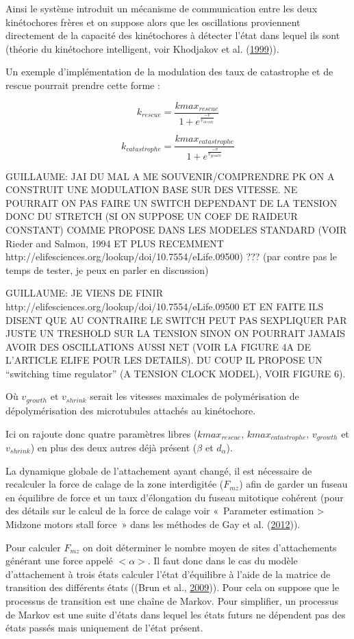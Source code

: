 \documentclass[12pt,a4paper,twoside,openright]{book}
\begin{document}
Ainsi le système introduit un mécanisme de communication entre les deux
kinétochores frères et on suppose alors que les oscillations proviennent
directement de la capacité des kinétochores à détecter l'état dans
lequel ils sont (théorie du kinétochore intelligent, voir Khodjakov et
al. (\protect\hyperlink{ref-Khodjakov1999}{1999})).

Un exemple d'implémentation de la modulation des taux de catastrophe et
de rescue pourrait prendre cette forme :

\[
k_{rescue} = \frac{kmax_{rescue}}{1 + e^{\frac{-v}{v_{shrink}}}}
\]

\[
k_{catastrophe} = \frac{kmax_{catastrophe}}{1 + e^{\frac{-v}{v_{growth}}}}
\]

GUILLAUME: JAI DU MAL A ME SOUVENIR/COMPRENDRE PK ON A CONSTRUIT UNE
MODULATION BASE SUR DES VITESSE. NE POURRAIT ON PAS FAIRE UN SWITCH
DEPENDANT DE LA TENSION DONC DU STRETCH (SI ON SUPPOSE UN COEF DE
RAIDEUR CONSTANT) COMME PROPOSE DANS LES MODELES STANDARD (VOIR Rieder
and Salmon, 1994 ET PLUS RECEMMENT
http://elifesciences.org/lookup/doi/10.7554/eLife.09500) ??? (par contre
pas le temps de tester, je peux en parler en discussion)

GUILLAUME: JE VIENS DE FINIR
http://elifesciences.org/lookup/doi/10.7554/eLife.09500 ET EN FAITE ILS
DISENT QUE AU CONTRAIRE LE SWITCH PEUT PAS SEXPLIQUER PAR JUSTE UN
TRESHOLD SUR LA TENSION SINON ON POURRAIT JAMAIS AVOIR DES OSCILLATIONS
AUSSI NET (VOIR LA FIGURE 4A DE L'ARTICLE ELIFE POUR LES DETAILS). DU
COUP IL PROPOSE UN ``switching time regulator'' (A TENSION CLOCK MODEL),
VOIR FIGURE 6).

Où \(v_{growth}\) et \(v_{shrink}\) serait les vitesses maximales de
polymérisation de dépolymérisation des microtubules attachés au
kinétochore.

Ici on rajoute donc quatre paramètres libres (\(kmax_{rescue}\),
\(kmax_{catastrophe}\), \(v_{growth}\) et \(v_{shrink}\)) en plus des
deux autres déjà présent (\(\beta\) et \(d_{\alpha}\)).

La dynamique globale de l'attachement ayant changé, il est nécessaire de
recalculer la force de calage de la zone interdigitée (\(F_{mz}\)) afin
de garder un fuseau en équilibre de force et un taux d'élongation du
fuseau mitotique cohérent (pour des détails sur le calcul de la force de
calage voir «~Parameter estimation \textgreater{} Midzone motors stall
force~» dans les méthodes de Gay et al.
(\protect\hyperlink{ref-Gay2012a}{2012})).

Pour calculer \(F_{mz}\) on doit déterminer le nombre moyen de sites
d'attachements générant une force appelé \(<\alpha>\). Il faut donc dans
le cas du modèle d'attachement à trois états calculer l'état d'équilibre
à l'aide de la matrice de transition des différents états ((Brun et al.,
\protect\hyperlink{ref-Brun2009}{2009})). Pour cela on suppose que le
processus de transition est une chaîne de Markov. Pour simplifier, un
processus de Markov est une suite d'états dans lequel les états futurs
ne dépendent pas des états passés mais uniquement de l'état présent.
\end{document}
